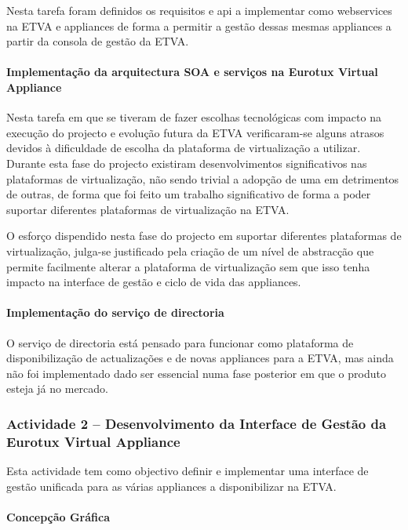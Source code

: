 \documentclass[a4paper,12pt,portugues]{article}
\begin{document}
Nesta tarefa foram definidos os requisitos e api a implementar como webservices na ETVA e appliances de forma a permitir a gestão dessas mesmas appliances a partir da consola de gestão da ETVA.



\paragraph{Implementação da arquitectura SOA e serviços na Eurotux Virtual Appliance} %

Nesta tarefa em que se tiveram de fazer escolhas tecnológicas com impacto na
execução do projecto e evolução futura da ETVA verificaram-se alguns atrasos
devidos à dificuldade de escolha da plataforma de virtualização a utilizar.
Durante esta fase do projecto existiram desenvolvimentos significativos nas
plataformas de virtualização, não sendo trivial a adopção de uma em
detrimentos de outras, de forma que foi feito um trabalho significativo de
forma a poder suportar diferentes plataformas de virtualização na ETVA.

O esforço dispendido nesta fase do projecto em suportar diferentes plataformas
de virtualização, julga-se justificado pela criação de um nível de abstracção
que permite facilmente alterar a plataforma de virtualização sem que isso
tenha impacto na interface de gestão e ciclo de vida das appliances.

\paragraph{Implementação do serviço de directoria} %

O serviço de directoria está pensado para funcionar como plataforma de
disponibilização de actualizações e de novas appliances para a ETVA, mas ainda
não foi implementado dado ser essencial numa fase posterior em que o produto
esteja já no mercado.

\subsubsection{Actividade 2 – Desenvolvimento da Interface de Gestão da
Eurotux Virtual Appliance} %

Esta actividade tem como objectivo definir e implementar uma interface de gestão unificada para as várias appliances a disponibilizar na ETVA.


\paragraph{Concepção Gráfica} %
\end{document}

